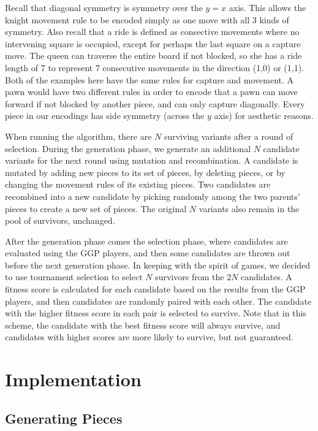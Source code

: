 \documentclass[11pt,letterpaper]{article}
\begin{document}
Recall that diagonal symmetry is symmetry over the $y=x$ axis. This allows the knight movement rule to be encoded simply as one move with all 3 kinds of symmetry. Also recall that a ride is defined as consective movements where no intervening square is occupied, except for perhaps the last square on a capture move. The queen can traverse the entire board if not blocked, so she has a ride length of 7 to represent 7 consecutive movements in the direction (1,0) or (1,1). Both of the examples here have the same rules for capture and movement. A pawn would have two different rules in order to encode that a pawn can move forward if not blocked by another piece, and can only capture diagonally. Every piece in our encodings has side symmetry (across the $y$ axis) for aesthetic reasons.

When running the algorithm, there are $N$ surviving variants after a round of selection. During the generation phase, we generate an additional $N$ candidate variants for the next round using mutation and recombination. A candidate is mutated by adding new pieces to its set of pieces, by deleting pieces, or by changing the movement rules of its existing pieces. Two candidates are recombined into a new candidate by picking randomly among the two parents' pieces to create a new set of pieces. The original $N$ variants also remain in the pool of survivors, unchanged.

After the generation phase comes the selection phase, where candidates are evaluated using the GGP players, and then some candidates are thrown out before the next generation phase. In keeping with the spirit of games, we decided to use tournament selection to select $N$ survivors from the $2N$ candidates. A fitness score is calculated for each candidate based on the results from the GGP players, and then candidates are randomly paired with each other. The candidate with the higher fitness score in each pair is selected to survive. Note that in this scheme, the candidate with the best fitness score will always survive, and candidates with higher scores are more likely to survive, but not guaranteed.

\section{Implementation}

\subsection{Generating Pieces}
\end{document}
